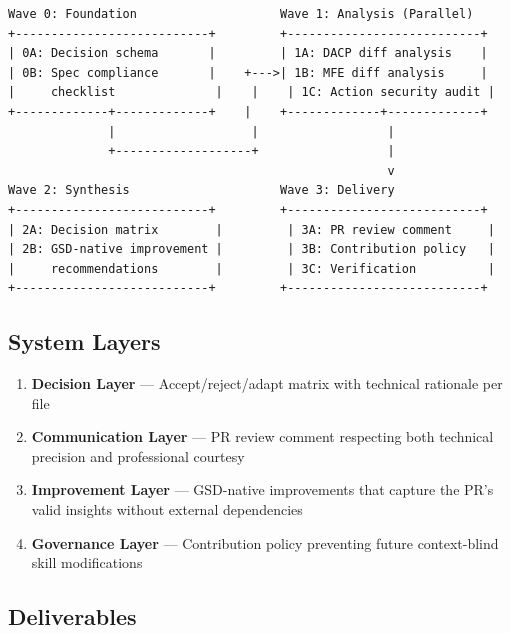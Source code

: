 \documentclass[11pt,letterpaper]{article}
\begin{document}
\begin{asciibox}
\begin{verbatim}
Wave 0: Foundation                    Wave 1: Analysis (Parallel)
+---------------------------+         +---------------------------+
| 0A: Decision schema       |         | 1A: DACP diff analysis    |
| 0B: Spec compliance       |    +--->| 1B: MFE diff analysis     |
|     checklist              |    |    | 1C: Action security audit |
+-------------+-------------+    |    +-------------+-------------+
              |                   |                  |
              +-------------------+                  |
                                                     v
Wave 2: Synthesis                     Wave 3: Delivery
+---------------------------+         +---------------------------+
| 2A: Decision matrix        |         | 3A: PR review comment     |
| 2B: GSD-native improvement |         | 3B: Contribution policy   |
|     recommendations        |         | 3C: Verification          |
+---------------------------+         +---------------------------+
\end{verbatim}
\end{asciibox}

\subsection{System Layers}

\begin{enumerate}[leftmargin=2em]
\item \textbf{Decision Layer} --- Accept/reject/adapt matrix with technical rationale per file
\item \textbf{Communication Layer} --- PR review comment respecting both technical precision and professional courtesy
\item \textbf{Improvement Layer} --- GSD-native improvements that capture the PR's valid insights without external dependencies
\item \textbf{Governance Layer} --- Contribution policy preventing future context-blind skill modifications
\end{enumerate}

\subsection{Deliverables}
\end{document}
